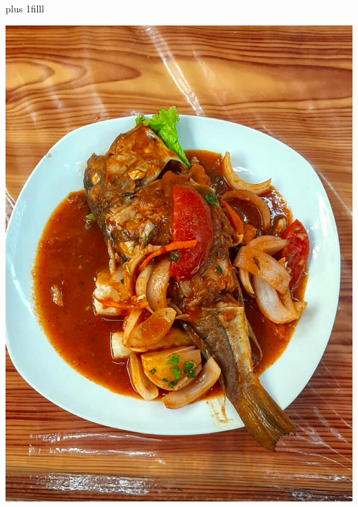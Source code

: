 \documentclass{photobook} %
\begin{document}
\maketitle
\pagestyle{empty}
\begin{minipage}{\imgwidth}%
\drawtrimcorners%
\vskip0pt plus 1filll
\begin{minipage}{\imgwidth}%
 \hfil\includegraphics[width=\imgwidth,height=\imgheight,keepaspectratio]{sudado_de_pescado.jpg}\hfil
\end{minipage}
\end{minipage}
\newpage
\end{document}
